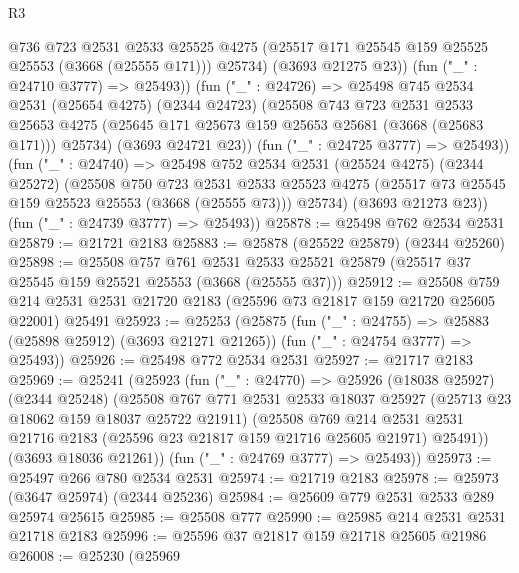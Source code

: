 \begin{lexlean}{R3}
\begin{coremodule}
              @736
              @723
              @2531
              @2533
              @25525
              @4275
              (@25517 @171 @25545 @159 @25525 @25553 (@3668 (@25555 @171)))
              @25734)
            (@3693 @21275 @23))
          (fun ("_" : @24710 @3777) => @25493))
        (fun ("_" : @24726) =>
        @25498
          @745
          @2534
          @2531
          (@25654 @4275)
          (@2344 @24723)
          (@25508
            @743
            @723
            @2531
            @2533
            @25653
            @4275
            (@25645 @171 @25673 @159 @25653 @25681 (@3668 (@25683 @171)))
            @25734)
          (@3693 @24721 @23))
        (fun ("_" : @24725 @3777) => @25493))
      (fun ("_" : @24740) =>
      @25498
        @752
        @2534
        @2531
        (@25524 @4275)
        (@2344 @25272)
        (@25508
          @750
          @723
          @2531
          @2533
          @25523
          @4275
          (@25517 @73 @25545 @159 @25523 @25553 (@3668 (@25555 @73)))
          @25734)
        (@3693 @21273 @23))
      (fun ("_" : @24739 @3777) => @25493))
@25878 := @25498 @762 @2534 @2531
@25879 := @21721 @2183
@25883 := @25878 (@25522 @25879) (@2344 @25260)
@25898 := @25508
    @757
    @761
    @2531
    @2533
    @25521
    @25879
    (@25517 @37 @25545 @159 @25521 @25553 (@3668 (@25555 @37)))
@25912 := @25508
    @759
    @214
    @2531
    @2531
    @21720
    @2183
    (@25596 @73 @21817 @159 @21720 @25605 @22001)
    @25491
@25923 := @25253
    (@25875
      (fun ("_" : @24755) => @25883 (@25898 @25912) (@3693 @21271 @21265))
      (fun ("_" : @24754 @3777) => @25493))
@25926 := @25498 @772 @2534 @2531
@25927 := @21717 @2183
@25969 := @25241
    (@25923
      (fun ("_" : @24770) =>
      @25926
        (@18038 @25927)
        (@2344 @25248)
        (@25508
          @767
          @771
          @2531
          @2533
          @18037
          @25927
          (@25713 @23 @18062 @159 @18037 @25722 @21911)
          (@25508
            @769
            @214
            @2531
            @2531
            @21716
            @2183
            (@25596 @23 @21817 @159 @21716 @25605 @21971)
            @25491))
        (@3693 @18036 @21261))
      (fun ("_" : @24769 @3777) => @25493))
@25973 := @25497 @266 @780 @2534 @2531
@25974 := @21719 @2183
@25978 := @25973 (@3647 @25974) (@2344 @25236)
@25984 := @25609 @779 @2531 @2533 @289 @25974 @25615
@25985 := @25508 @777
@25990 := @25985 @214 @2531 @2531 @21718 @2183
@25996 := @25596 @37 @21817 @159 @21718 @25605 @21986
@26008 := @25230
    (@25969

\end{coremodule}
\end{lexlean}
